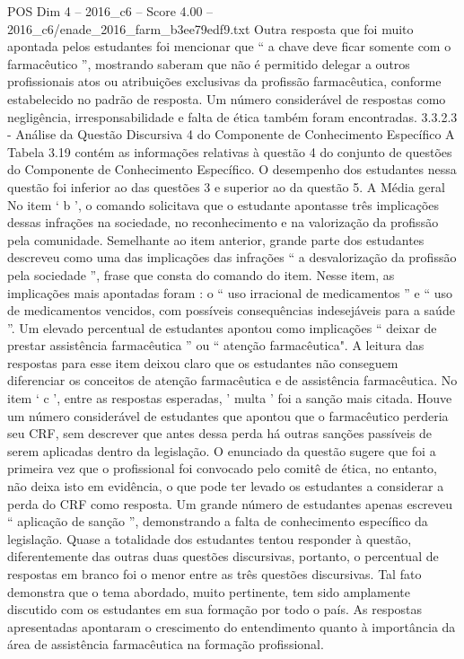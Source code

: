 \begin{textsample}{POS Dim 4 – 2016\_c6 – Score 4.00 – 2016\_c6/enade\_2016\_farm\_b3ee79edf9.txt}
Outra resposta que foi muito apontada pelos estudantes foi mencionar que “ a chave deve ficar somente com o farmacêutico ”, mostrando saberam que não é permitido delegar a outros profissionais atos ou atribuições exclusivas da profissão farmacêutica, conforme estabelecido no padrão de resposta.
Um número considerável de respostas como negligência, irresponsabilidade e falta de ética também foram encontradas. 3.3.2.3 - Análise da Questão Discursiva 4 do Componente de Conhecimento Específico A Tabela 3.19 contém as informações relativas à questão 4 do conjunto de questões do Componente de Conhecimento Específico.
O desempenho dos estudantes nessa questão foi inferior ao das questões 3 e superior ao da questão 5.
A Média geral No item ‘ b ’, o comando solicitava que o estudante apontasse três implicações dessas infrações na sociedade, no reconhecimento e na valorização da profissão pela comunidade.
Semelhante ao item anterior, grande parte dos estudantes descreveu como uma das implicações das infrações “ a desvalorização da profissão pela sociedade ”, frase que consta do comando do item.
Nesse item, as implicações mais apontadas foram : o “ uso irracional de medicamentos ” e “ uso de medicamentos vencidos, com possíveis consequências indesejáveis para a saúde ”.
Um elevado percentual de estudantes apontou como implicações “ deixar de prestar assistência farmacêutica ” ou “ atenção farmacêutica".
A leitura das respostas para esse item deixou claro que os estudantes não conseguem diferenciar os conceitos de atenção farmacêutica e de assistência farmacêutica.
No item ‘ c ’, entre as respostas esperadas, ' multa ' foi a sanção mais citada.
Houve um número considerável de estudantes que apontou que o farmacêutico perderia seu CRF, sem descrever que antes dessa perda há outras sanções passíveis de serem aplicadas dentro da legislação.
O enunciado da questão sugere que foi a primeira vez que o profissional foi convocado pelo comitê de ética, no entanto, não deixa isto em evidência, o que pode ter levado os estudantes a considerar a perda do CRF como resposta.
Um grande número de estudantes apenas escreveu “ aplicação de sanção ”, demonstrando a falta de conhecimento específico da legislação.
Quase a totalidade dos estudantes tentou responder à questão, diferentemente das outras duas questões discursivas, portanto, o percentual de respostas em branco foi o menor entre as três questões discursivas.
Tal fato demonstra que o tema abordado, muito pertinente, tem sido amplamente discutido com os estudantes em sua formação por todo o país.
As respostas apresentadas apontaram o crescimento do entendimento quanto à importância da área de assistência farmacêutica na formação profissional.

\end{textsample}
